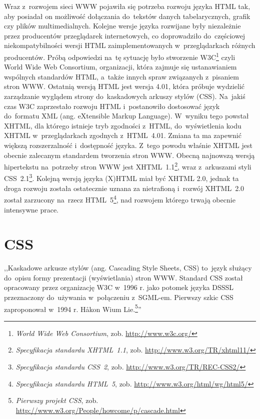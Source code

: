 \documentclass[a4paper,12pt,oneside]{report}
\begin{document}
Wraz z~rozwojem sieci WWW pojawiła się potrzeba rozwoju języka HTML tak, aby posiadał on możliwość dołączania do~tekstów danych tabelarycznych, grafik czy plików multimedialnych. Kolejne wersje języka rozwijane były niezależnie przez producentów przeglądarek internetowych, co doprowadziło do~częściowej  niekompatybilności wersji HTML zaimplementowanych w~przeglądarkach różnych producentów. Próbą odpowiedzi na~tę sytuację było stworzenie W3C\footnote{\emph{World Wide Web Consortium}, zob. \url{http://www.w3c.org/}} czyli World Wide Web Consortium, organizacji, która zajmuje się ustanawianiem wspólnych standardów HTML, a~także innych spraw związanych z~pisaniem stron WWW. Ostatnią wersją HTML jest wersja 4.01, która próbuje wydzielić zarządzanie wyglądem strony do~kaskadowych arkuszy stylów (CSS). Na~jakiś czas W3C zaprzestało rozwoju HTML i~postanowiło dostosować język do~formatu XML (ang. eXtensible Markup Language). W~wyniku tego powstał XHTML, dla którego istnieje tryb zgodności z~HTML, do~wyświetlenia kodu XHTML w~przeglądarkach zgodnych z~HTML~4.01. Zmiana ta ma zapewnić większą rozszerzalność i~dostępność języka. Z~tego powodu właśnie XHTML jest obecnie zalecanym standardem tworzenia stron WWW. Obecną najnowszą wersją hipertekstu na~potrzeby stron WWW jest XHTML~1.1\footnote{\emph{Specyfikacja standardu XHTML~1.1}, zob. \url{http://www.w3.org/TR/xhtml11/}}, wraz z~arkuszami styli CSS~2.1\footnote{\emph{Specyfikacja standardu CSS~2}, zob. \url{http://www.w3.org/TR/REC-CSS2/}}. Kolejną wersją języka (X)HTML miał być XHTML 2.0, jednak ta droga rozwoju została ostatecznie uznana za nietrafioną i~rozwój XHTML~2.0 został zarzucony na~rzecz HTML~5\footnote{\emph{Specyfikacja standardu HTML~5}, zob. \url{http://www.w3.org/html/wg/html5/}}, nad rozwojem którego trwają obecnie intensywne prace.

\section{CSS}
\label{sec:css}
,,Kaskadowe arkusze stylów (ang. Cascading Style Sheets, CSS) to~język służący do~opisu formy prezentacji (wyświetlania) stron WWW. Standard CSS został opracowany przez organizację W3C w~1996 r. jako potomek języka DSSSL przeznaczony do~używania w~połączeniu z~SGML-em. Pierwszy szkic CSS zaproponował w~1994 r. Håkon Wium Lie.\footnote{\emph{Pierwszy projekt CSS}, zob. \url{http://www.w3.org/People/howcome/p/cascade.html}}''
\end{document}
